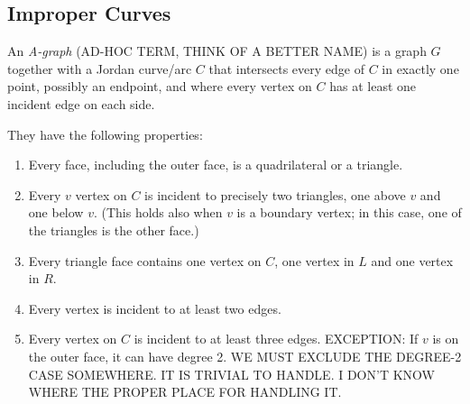 \subsection{Improper Curves}

\begin{definition}
  An \emph{A-graph} (AD-HOC TERM, THINK OF A BETTER NAME)
is a graph $G$ together with a Jordan curve/arc $C$ that intersects
every edge of $C$ in exactly one point, possibly an endpoint,
and where every vertex on $C$ has at least one incident edge on each side.
\end{definition}

They have the following properties:

\begin{enumerate}
\item Every face, including the outer face, is a quadrilateral or a
  triangle.
\item Every $v$ vertex on $C$ is incident to precisely two triangles,
  one 
above $v$ and one below $v$. (This holds also when $v$ is a boundary
vertex; in this case, one of the triangles is the other face.)
\item Every triangle face contains one vertex on $C$, one vertex in
  $L$ and one vertex in $R$.
\item Every vertex is incident to at least two edges.
\item Every vertex on $C$ is incident to at least three edges.
EXCEPTION: If $v$ is on the outer face, it can have degree 2.
WE MUST EXCLUDE THE DEGREE-2 CASE SOMEWHERE. IT IS TRIVIAL TO HANDLE.
I DON'T KNOW WHERE THE PROPER PLACE FOR HANDLING IT.
\end{enumerate}

